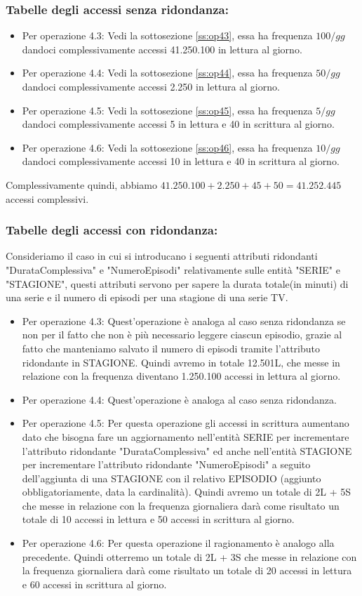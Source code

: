 \documentclass[a4paper,12pt]{report}
\begin{document}
\subsubsection{Tabelle degli accessi senza ridondanza:}
\begin{itemize}
	\item Per operazione 4.3: Vedi la sottosezione \ref{ss:op43}, essa ha frequenza $100/gg$ dandoci complessivamente accessi 41.250.100 in lettura al giorno.
	\item Per operazione 4.4: Vedi la sottosezione \ref{ss:op44}, essa ha frequenza $50/gg$ dandoci complessivamente accessi 2.250 in lettura al giorno.
	\item Per operazione 4.5: Vedi la sottosezione \ref{ss:op45}, essa ha frequenza $5/gg$ dandoci complessivamente accessi 5 in lettura e 40 in scrittura al giorno.
	\item Per operazione 4.6: Vedi la sottosezione \ref{ss:op46}, essa ha frequenza $10/gg$ dandoci complessivamente accessi 10 in lettura e 40 in scrittura al giorno.
\end{itemize}
Complessivamente quindi, abbiamo $41.250.100 + 2.250 + 45 + 50 = 41.252.445$ accessi complessivi.
\subsubsection{Tabelle degli accessi con ridondanza:}
Consideriamo il caso in cui si introducano i seguenti attributi ridondanti "DurataComplessiva" e "NumeroEpisodi" relativamente sulle entità "SERIE" e "STAGIONE", questi attributi servono per sapere la durata totale(in minuti) di una serie e il numero di episodi per una stagione di una serie TV.
\begin{itemize}
	\item Per operazione 4.3: Quest'operazione è analoga al caso senza ridondanza se non per il fatto che non è più necessario leggere ciascun episodio, grazie al fatto che manteniamo salvato il numero di episodi tramite l'attributo ridondante in STAGIONE. Quindi avremo in totale 12.501L, che messe in relazione con la frequenza diventano 1.250.100 accessi in lettura al giorno.
	\item Per operazione 4.4: Quest'operazione è analoga al caso senza ridondanza.
	\item Per operazione 4.5: Per questa operazione gli accessi in scrittura aumentano dato che bisogna fare un aggiornamento nell'entità SERIE per incrementare l'attributo ridondante "DurataComplessiva" ed anche nell'entità STAGIONE per incrementare l'attributo ridondante "NumeroEpisodi" a seguito dell'aggiunta di una STAGIONE con il relativo EPISODIO (aggiunto obbligatoriamente, data la cardinalità). 
	Quindi avremo un totale di 2L + 5S che messe in relazione con la frequenza giornaliera darà come risultato un totale di 10 accessi in lettura e 50 accessi in scrittura al giorno.
	\item Per operazione 4.6: Per questa operazione il ragionamento è analogo alla precedente. Quindi otterremo un totale di 2L + 3S che messe in relazione con la frequenza giornaliera darà come risultato un totale di 20 accessi in lettura e 60 accessi in scrittura al giorno.
\end{itemize}
\end{document}
